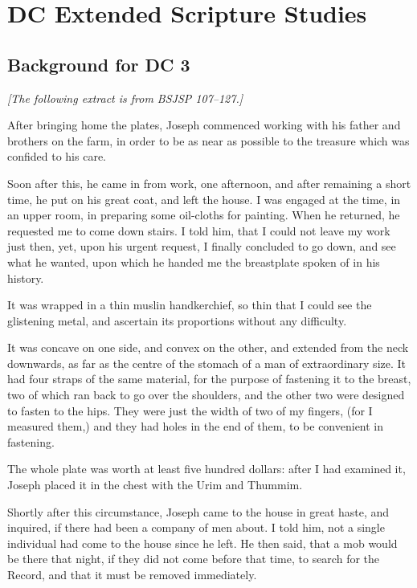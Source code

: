 \section{DC Extended Scripture Studies}
	\label{EXSS-DC}
	
	\subsection{Background for DC 3}
		\label{EXSS-DC3-BACKGROUND}
		
		\textit{[The following extract is from BSJSP 107--127.]}

		After bringing home the plates, Joseph commenced working with his father and brothers on the farm, in order to be as near as possible to the treasure which was confided to his care.

		Soon after this, he came in from work, one afternoon, and after remaining a short time, he put on his great coat, and left the house. I was engaged at the time, in an upper room, in preparing some oil-cloths for painting. When he returned, he requested me to come down stairs. I told him, that I could not leave my work just then, yet, upon his urgent request, I finally concluded to go down, and see what he wanted, upon which he handed me the breastplate spoken of in his history.

		It was wrapped in a thin muslin handkerchief, so thin that I could see the glistening metal, and ascertain its proportions without any difficulty.

		It was concave on one side, and convex on the other, and extended from the neck downwards, as far as the centre of the stomach of a man of extraordinary size. It had four straps of the same material, for the purpose of fastening it to the breast, two of which ran back to go over the shoulders, and the other two were designed to fasten to the hips. They were just the width of two of my fingers, (for I measured them,) and they had holes in the end of them, to be convenient in fastening.

		The whole plate was worth at least five hundred dollars: after I had examined it, Joseph placed it in the chest with the Urim and Thummim.

		Shortly after this circumstance, Joseph came to the house in great haste, and inquired, if there had been a company of men about. I told him, not a single individual had come to the house since he left. He then said, that a mob would be there that night, if they did not come before that time, to search for the Record, and that it must be removed immediately.

